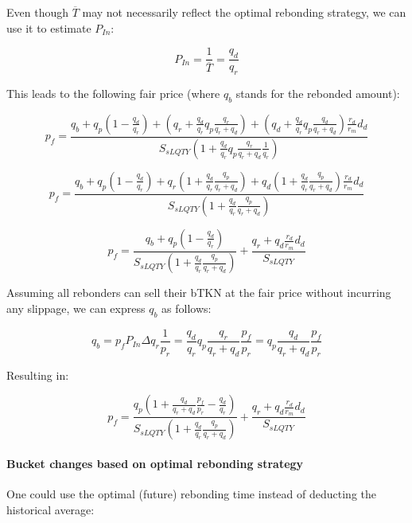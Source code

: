 \documentclass{article}
\begin{document}
Even though $\overline{T}$ may not necessarily reflect the optimal rebonding strategy, we can use it to estimate $P_{In}$:

\begin{equation}
   P_{In} = \frac{1}{\overline{T}} = \frac{q_{d}}{q_{r}}
\end{equation}

This leads to the following fair price (where $q_b$ stands for the rebonded amount):

\[
p_{f} = \frac{q_{b}+q_{p} \left(1-\frac{q_{d}}{q_{r}}\right)+\left(q_{r}+\frac{q_{d}}{q_{r}}q_{p}\frac{q_{r}}{q_{r}+q_{d}}\right)+ \left(q_{d}+\frac{q_{d}}{q_{r}}q_{p}\frac{q_{d}}{q_{r}+q_{d}}\right)\frac{r_{d}}{r_{m}}d_{d}}{S_{sLQTY} \left( 1+\frac{q_{d}}{q_{r}} q_{p}\frac{q_{r}}{q_{r}+q_{d}}\frac{1}{q_{r}} \right)}
\]

\[
p_{f} = \frac{q_{b}+q_{p} \left(1-\frac{q_{d}}{q_{r}}\right)+q_{r}\left(1+\frac{q_{d}}{q_{r}}\frac{q_{p}}{q_{r}+q_{d}}\right)+q_{d} \left(1+\frac{q_{d}}{q_{r}}\frac{q_{p}}{q_{r}+q_{d}}\right)\frac{r_{d}}{r_{m}}d_{d}}{S_{sLQTY} \left( 1+\frac{q_{d}}{q_{r}}\frac{q_{p}}{q_{r}+q_{d}} \right)}
\]

\begin{equation}
p_{f} = \frac{q_{b}+q_{p} \left(1-\frac{q_{d}}{q_{r}}\right)}{S_{sLQTY} \left( 1+\frac{q_{d}}{q_{r}}\frac{q_{p}}{q_{r}+q_{d}} \right)} + \frac{q_{r}+q_{d}\frac{r_{d}}{r_{m}}d_{d}}{S_{sLQTY}}
\end{equation}

Assuming all rebonders can sell their bTKN at the fair price without incurring any slippage, we can express $q_b$ as follows:

\begin{equation}
q_{b} = p_f P_{In} \Delta q_{r} \frac{1}{p_r} = \frac{q_{d}}{q_{r}} q_p \frac{q_{r}}{q_{r}+q_{d}} \frac{p_{f}}{p_{r}}  = q_p \frac{q_{d}}{q_{r}+q_{d}} \frac{p_{f}}{p_{r}}
\end{equation}

Resulting in:

\begin{equation}
p_{f} = \frac{q_{p} \left(1+\frac{q_{d}}{q_{r}+q_{d}} \frac{p_{f}}{p_{r}}-\frac{q_{d}}{q_{r}}\right)}{S_{sLQTY} \left( 1+\frac{q_{d}}{q_{r}}\frac{q_{p}}{q_{r}+q_{d}} \right)} + \frac{q_{r}+q_{d}\frac{r_{d}}{r_{m}}d_{d}}{S_{sLQTY}}
\end{equation}

\paragraph{Bucket changes based on optimal rebonding strategy}
One could use the optimal (future) rebonding time instead of deducting the historical average:
\end{document}
